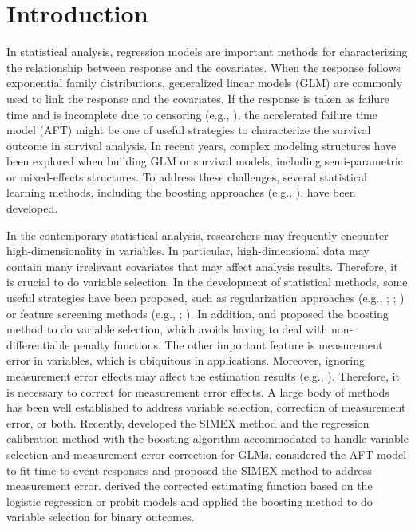 \section{Introduction} \label{Introduction}


In statistical analysis, regression models are {important methods for characterizing the relationship between response and the covariates. When} the response follows exponential family distributions, generalized linear models (GLM) are commonly used to link the response and the covariates. If the response is taken as failure time and is incomplete due to censoring (e.g., \citealp{Lawless:2003}), the accelerated failure time model (AFT) might be one of useful strategies to characterize the survival outcome in survival analysis. In recent years, complex modeling structures have been explored when building GLM or survival models, including semi-parametric or mixed-effects structures. To address these challenges, several statistical learning methods, including the boosting approaches (e.g., \citealp{Hastie:2008}), have been developed.

In the contemporary statistical analysis, researchers may frequently encounter high-dimensionality in variables. In particular, {high-dimensional data} may contain many irrelevant covariates that {may} affect analysis results. Therefore, it is crucial to do variable selection. In the development of statistical methods, some useful strategies have been proposed, such as regularization approaches (e.g., \citealp{Tibshirani:1996}; \citealp{Zou:2006}; \citealp{Zou:2005}) or feature screening methods (e.g., \citealp{Chen:2021}; \citealp{Chen:2020}). In addition, \cite{Wolfson:2011} and \cite{Brown:2017} proposed the boosting method to do variable selection, which avoids {having to deal with} non-differentiable penalty functions. The other important feature is measurement error in variables, which is ubiquitous in applications. Moreover, ignoring measurement error effects may affect the estimation results (e.g., \citealp{ChenYi:2021}). Therefore, it is necessary to correct for measurement error effects. {A} large body of methods has been well established to address variable selection, correction of measurement error, or both. Recently, \cite{Chen:2023} developed the SIMEX method and the regression calibration method with the boosting algorithm accommodated to handle variable selection and measurement error correction for GLMs. \cite{ChenQiu:2023} considered the AFT model to fit time-to-event responses and proposed the SIMEX method to address measurement error. \cite{Chen:2023b} derived the corrected estimating function based on the logistic regression or probit models and applied the boosting method to do variable selection for binary outcomes.


